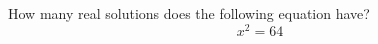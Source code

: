 \documentclass{ximera}
\author{David Kish}
\begin{document}
\begin{exercise}
How many real solutions does the following equation have? \\
\[
x^2=64
\]
\begin{multipleChoice}  
\end{multipleChoice}  
\end{exercise}
\end{document}

